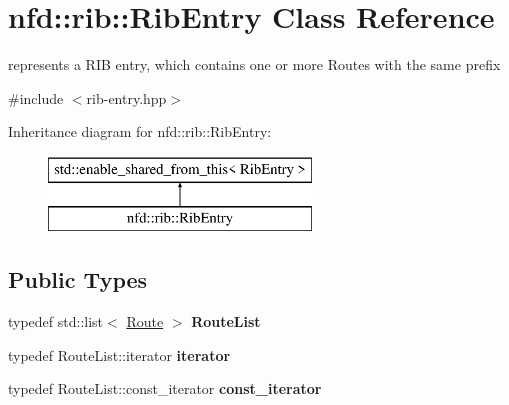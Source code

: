 \hypertarget{classnfd_1_1rib_1_1RibEntry}{}\section{nfd\+:\+:rib\+:\+:Rib\+Entry Class Reference}
\label{classnfd_1_1rib_1_1RibEntry}


represents a R\+IB entry, which contains one or more Routes with the same prefix  




{\ttfamily \#include $<$rib-\/entry.\+hpp$>$}

Inheritance diagram for nfd\+:\+:rib\+:\+:Rib\+Entry\+:\begin{figure}[H]
\begin{center}
\leavevmode
\includegraphics[height=2.000000cm]{classnfd_1_1rib_1_1RibEntry}
\end{center}
\end{figure}
\subsection*{Public Types}
\begin{DoxyCompactItemize}
\item 
typedef std\+::list$<$ \hyperlink{classnfd_1_1rib_1_1Route}{Route} $>$ {\bfseries Route\+List}\hypertarget{classnfd_1_1rib_1_1RibEntry_aca6d6b237253217607305566de6d5e3c}{}\label{classnfd_1_1rib_1_1RibEntry_aca6d6b237253217607305566de6d5e3c}

\item 
typedef Route\+List\+::iterator {\bfseries iterator}\hypertarget{classnfd_1_1rib_1_1RibEntry_aedefd0da57d4eb19f5b8245792c6df71}{}\label{classnfd_1_1rib_1_1RibEntry_aedefd0da57d4eb19f5b8245792c6df71}

\item 
typedef Route\+List\+::const\+\_\+iterator {\bfseries const\+\_\+iterator}\hypertarget{classnfd_1_1rib_1_1RibEntry_accf7e4282b566a2804cbb067407d4713}{}\label{classnfd_1_1rib_1_1RibEntry_accf7e4282b566a2804cbb067407d4713}

\end{DoxyCompactItemize}
